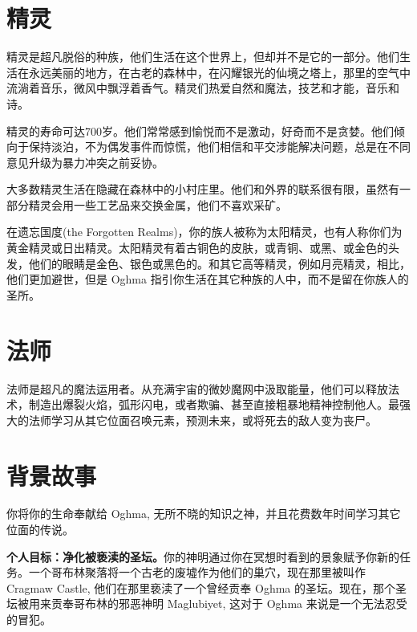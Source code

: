 \documentclass[letterpaper,twocolumn,openany,nodeprecatedcode]{dndbook}
\begin{document}



\mainmatter%

\section{精灵}

\footnotesize

精灵是超凡脱俗的种族，他们生活在这个世界上，但却并不是它的一部分。他们生活在永远美丽的地方，在古老的森林中，在闪耀银光的仙境之塔上，那里的空气中流淌着音乐，微风中飘浮着香气。精灵们热爱自然和魔法，技艺和才能，音乐和诗。

精灵的寿命可达700岁。他们常常感到愉悦而不是激动，好奇而不是贪婪。他们倾向于保持淡泊，不为偶发事件而惊慌，他们相信和平交涉能解决问题，总是在不同意见升级为暴力冲突之前妥协。

大多数精灵生活在隐藏在森林中的小村庄里。他们和外界的联系很有限，虽然有一部分精灵会用一些工艺品来交换金属，他们不喜欢采矿。

在遗忘国度(the Forgotten Realms)，你的族人被称为太阳精灵，也有人称你们为黄金精灵或日出精灵。太阳精灵有着古铜色的皮肤，或青铜、或黑、或金色的头发，他们的眼睛是金色、银色或黑色的。和其它高等精灵，例如月亮精灵，相比，他们更加避世，但是 Oghma 指引你生活在其它种族的人中，而不是留在你族人的圣所。

\section{法师}

法师是超凡的魔法运用者。从充满宇宙的微妙魔网中汲取能量，他们可以释放法术，制造出爆裂火焰，弧形闪电，或者欺骗、甚至直接粗暴地精神控制他人。最强大的法师学习从其它位面召唤元素，预测未来，或将死去的敌人变为丧尸。

\section{背景故事}

你将你的生命奉献给 Oghma, 无所不晓的知识之神，并且花费数年时间学习其它位面的传说。

\textbf{个人目标：净化被亵渎的圣坛。}你的神明通过你在冥想时看到的景象赋予你新的任务。一个哥布林聚落将一个古老的废墟作为他们的巢穴，现在那里被叫作 Cragmaw Castle, 他们在那里亵渎了一个曾经贡奉 Oghma 的圣坛。现在，那个圣坛被用来贡奉哥布林的邪恶神明 Maglubiyet, 这对于 Oghma 来说是一个无法忍受的冒犯。
\end{document}
